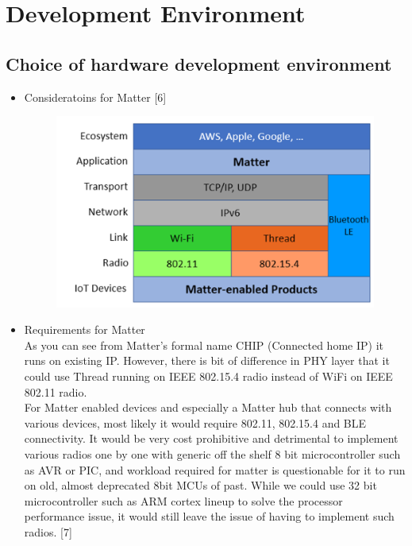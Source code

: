 \documentclass[conference]{IEEEtran}
\begin{document}
\begin{enumerate}[label=\arabic*.]
\begin{enumerate}[label=\alph*.]
\end{enumerate}

\end{enumerate}


\section{\large{Development Environment}}

\subsection{\large{Choice of hardware development environment}}
\begin{itemize}
\item Consideratoins for Matter [6]\\
\begin{figure}[H]\centering \includegraphics[scale=0.25]{images/consideratoins-matter.png}\end{figure}
\item Requirements for Matter\\
As you can see from Matter’s formal name CHIP (Connected home IP) it runs on existing IP. However, there is bit of difference in PHY layer that it could use Thread running on IEEE 802.15.4 radio instead of WiFi on IEEE 802.11 radio.\\
For Matter enabled devices and especially a Matter hub that connects with various devices, most likely it would require 802.11, 802.15.4 and BLE connectivity.  It would be very cost prohibitive and detrimental to implement various radios one by one with generic off the shelf 8 bit microcontroller such as AVR or PIC, and workload required for matter is questionable for it to run on old, almost deprecated 8bit MCUs of past. While we could use 32 bit microcontroller such as ARM cortex lineup to solve the processor performance issue, it would still leave the issue of having to implement such radios. [7]\\

\end{itemize}
\end{document}
